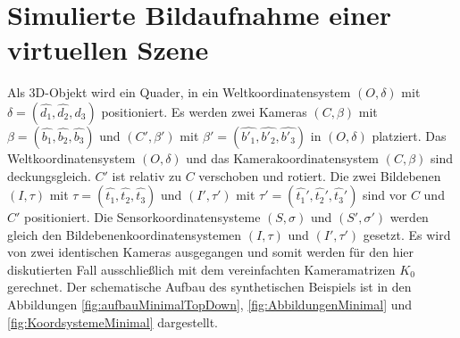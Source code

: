 \pagebreak

%



\section{Simulierte Bildaufnahme einer virtuellen Szene}

Als 3D-Objekt wird ein Quader, in ein Weltkoordinatensystem $(O,\delta)$ mit $\delta = (\hat{d_1},\hat{d_2},\hat{d_3})$ positioniert. Es werden zwei Kameras $(C,\beta)$ mit $\beta = (\hat{b_1},\hat{b_2},\hat{b_3})$ und $(C',\beta')$ mit $\beta' = (\hat{b'_1},\hat{b'_2},\hat{b'_3})$ in $(O,\delta)$ platziert. Das Weltkoordinatensystem $(O,\delta)$ und das Kamerakoordinatensystem $(C,\beta)$ sind deckungsgleich. $C'$ ist relativ zu $C$ verschoben und rotiert. Die zwei Bildebenen $(I,\tau)$ mit $\tau = (\hat{t_1},\hat{t_2},\hat{t_3})$ und $(I',\tau')$ mit $\tau' = (\hat{t_1}',\hat{t_2}',\hat{t_3}')$ sind vor $C$ und $C'$ positioniert. Die Sensorkoordinatensysteme $(S,\sigma)$ und $(S',\sigma')$ werden gleich den Bildebenenkoordinatensystemen $(I,\tau)$ und $(I',\tau')$ gesetzt. Es wird von zwei identischen Kameras ausgegangen und somit werden für den hier diskutierten Fall ausschließlich mit dem vereinfachten Kameramatrizen $K_0$ gerechnet. Der schematische Aufbau des synthetischen Beispiels ist in den Abbildungen \ref{fig:aufbauMinimalTopDown}, \ref{fig:AbbildungenMinimal} und \ref{fig:KoordsystemeMinimal} dargestellt.




